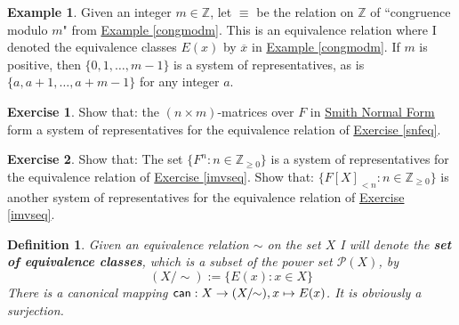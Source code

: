 \documentclass[11pt]{amsbook}
\newtheorem{definition}[theorem]{Definition}
\theoremstyle{definition}
\newtheorem{ex}[theorem]{Example}
\newtheorem{exercise}{Exercise}
\begin{document}
\begin{ex}
\label{congex}
Given an integer $m\in \mathbb{Z}$, let $\equiv$ be the relation on $\mathbb{Z}$ of ``congruence modulo $m$"  from \hyperref[congmodm]{Example \ref{congmodm}}. This is an equivalence relation where I denoted  the equivalence classes $E(x)$ by $\overline{x}$ in \hyperref[congmodm]{Example \ref{congmodm}}. If $m$ is positive, then $\{0, 1, \ldots , m-1\}$ is a system of representatives, as is $\{ a , a+1, \ldots , a+m-1 \}$ for any integer $a$.
\end{ex}

\begin{exercise}
Show that: the $(n\times m)$-matrices over $F$ in \hyperref[smithform]{Smith Normal Form} form a system of representatives for the equivalence relation of \hyperref[imvseq]{Exercise \ref{snfeq}}.
\end{exercise}

\begin{exercise}
Show that: The set $\{ F^n: n\in \mathbb{Z}_{\geqslant 0}\}$ is a system of representatives for the equivalence relation of \hyperref[imvseq]{Exercise \ref{imvseq}}. Show that: $\{F[X]_{<n}: n\in \mathbb{Z}_{\geqslant 0}\}$ is another system of representatives for the equivalence relation of \hyperref[imvseq]{Exercise \ref{imvseq}}.
\end{exercise}

\begin{definition}Given an equivalence relation $\sim$ on the set $X$ I will denote the {\bf set of equivalence classes}, which is a subset of the power set $\mathcal{P}(X)$, by $$(X/\!\!\sim) := \{ E(x) : x\in X\}$$ There is a canonical mapping ${\sf can}: X \to (X/\!\!\sim), x\mapsto E(x)$. It is obviously a surjection.
\end{definition}
\end{document}
